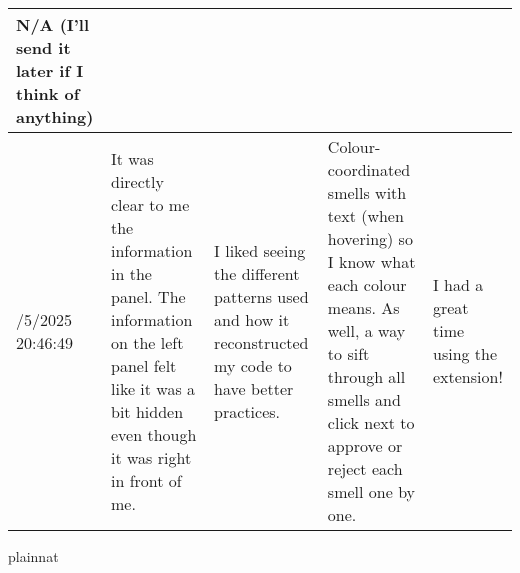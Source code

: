 \documentclass{article}
\begin{document}
\begin{table}[H]
\begin{tabularx}{\linewidth}{@{}>{\RaggedRight}p{1.8cm} >{\RaggedRight}X >{\RaggedRight}X >{\RaggedRight}X >{\RaggedRight}X@{}}
    N/A (I'll send it later if I think of anything) \\
    \midrule
    3/5/2025 20:46:49 & 
    It was directly clear to me the information in the panel. The information on the left panel felt like it was a bit hidden even though it was right in front of me. & 
    I liked seeing the different patterns used and how it reconstructed my code to have better practices. & 
    Colour-coordinated smells with text (when hovering) so I know what each colour means. As well, a way to sift through all smells and click next to approve or reject each smell one by one. & 
    I had a great time using the extension! \\
    \bottomrule
\end{tabularx}
\end{table}


 {plainnat}

\end{document}
